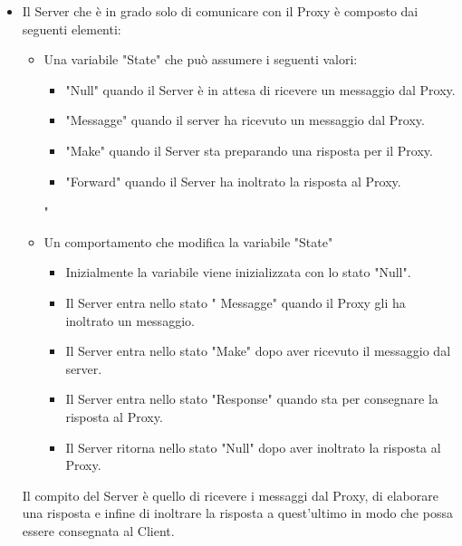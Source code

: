 \documentclass[13pt,a4paper]{article}
\begin{document}
\begin{itemize}
		\item Il Server che è in grado solo di comunicare con il Proxy è composto dai seguenti elementi:
		\begin{itemize}
			\item Una variabile "State" che può assumere i seguenti valori:
			\begin{itemize}
				\item "Null" quando il Server è in attesa di ricevere un messaggio dal Proxy.
				\item "Messagge" quando il server ha ricevuto un messaggio dal Proxy.
				\item "Make" quando il Server sta preparando una risposta per il Proxy.
				\item "Forward" quando il Server ha inoltrato la risposta al Proxy.
			\end{itemize}"
		\item Un comportamento che modifica la variabile "State"
		\begin{itemize}
			\item Inizialmente la variabile viene inizializzata con lo stato "Null".
			\item Il Server entra nello stato " Messagge" quando il Proxy gli ha inoltrato un messaggio.
			\item Il Server entra nello stato "Make" dopo aver ricevuto il messaggio dal server.
			\item Il Server entra nello stato "Response" quando sta per consegnare la risposta al Proxy.
			\item Il Server ritorna nello stato "Null" dopo aver inoltrato la risposta al Proxy.
		\end{itemize}
		\end{itemize}
	 Il compito del Server è quello di ricevere i messaggi dal Proxy, di elaborare una risposta e infine di inoltrare la risposta a quest'ultimo in modo che possa essere consegnata al Client.
	\end{itemize}
\end{document}
